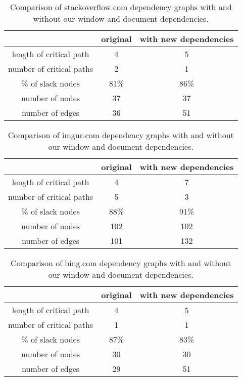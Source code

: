 \begin{table*}[tb]
\centering
\small
\begin{tabular}{|c|c|c|}
\hline
 & original & with new dependencies \\
\hline
length of critical path & 4 & 5 \\
number of critical paths & 2 & 1 \\
\% of slack nodes & 81\% & 86\% \\
number of nodes & 37 & 37 \\
number of edges & 36 & 51 \\
\hline
\end{tabular}\caption{Comparison of stackoverflow.com dependency graphs with and without our window and document dependencies.}
\label{t:stackoverflowgraph}
\end{table*}

\begin{table*}[tb]
\centering
\small
\begin{tabular}{|c|c|c|}
\hline
 & original & with new dependencies \\
\hline
length of critical path & 4 & 7 \\
number of critical paths & 5 & 3 \\
\% of slack nodes & 88\% & 91\% \\
number of nodes & 102 & 102 \\
number of edges & 101 & 132 \\
\hline
\end{tabular}\caption{Comparison of imgur.com dependency graphs with and without our window and document dependencies.}
\label{t:imgurgraph}
\end{table*}

\begin{table*}[tb]
\centering
\small
\begin{tabular}{|c|c|c|}
\hline
 & original & with new dependencies \\
\hline
length of critical path & 4 & 5 \\
number of critical paths & 1 & 1 \\
\% of slack nodes & 87\% & 83\% \\
number of nodes & 30 & 30 \\
number of edges & 29 & 51 \\
\hline
\end{tabular}\caption{Comparison of bing.com dependency graphs with and without our window and document dependencies.}
\label{t:binggraph}
\end{table*}

